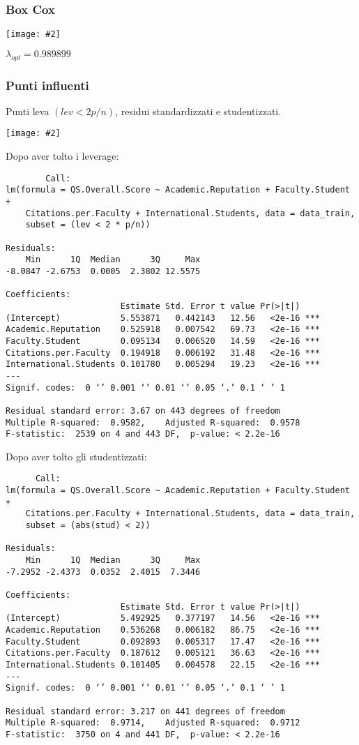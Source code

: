 \documentclass{beamer}
\newcommand{\fg}[2]{%
  \begin{center}
      \texttt{[image: \#2]}%
  \end{center}
}
\begin{document}
\begin{frame}[fragile]
\frametitle{Box Cox}
    \fg{0.6}{boxcoxfin.jpg}
    $\lambda_{opt} = 0.989899$
\end{frame}

\begin{frame}[fragile]
\frametitle{Punti influenti}
    Punti leva $(lev < 2  p/n)$, residui standardizzati e studentizzati.
    \fg{0.6}{plotreslev.jpg}
\end{frame}

\begin{frame}[fragile]
    Dopo aver tolto i leverage:
    {\tiny
    \begin{verbatim}
        Call:
lm(formula = QS.Overall.Score ~ Academic.Reputation + Faculty.Student + 
    Citations.per.Faculty + International.Students, data = data_train, 
    subset = (lev < 2 * p/n))

Residuals:
    Min      1Q  Median      3Q     Max 
-8.0847 -2.6753  0.0005  2.3802 12.5575 

Coefficients:
                       Estimate Std. Error t value Pr(>|t|)    
(Intercept)            5.553871   0.442143   12.56   <2e-16 ***
Academic.Reputation    0.525918   0.007542   69.73   <2e-16 ***
Faculty.Student        0.095134   0.006520   14.59   <2e-16 ***
Citations.per.Faculty  0.194918   0.006192   31.48   <2e-16 ***
International.Students 0.101780   0.005294   19.23   <2e-16 ***
---
Signif. codes:  0 ‘’ 0.001 ‘’ 0.01 ‘’ 0.05 ‘.’ 0.1 ‘ ’ 1

Residual standard error: 3.67 on 443 degrees of freedom
Multiple R-squared:  0.9582,	Adjusted R-squared:  0.9578 
F-statistic:  2539 on 4 and 443 DF,  p-value: < 2.2e-16
    \end{verbatim}
    }
\end{frame}

\begin{frame}[fragile]
    Dopo aver tolto gli studentizzati:
    {\tiny
    \begin{verbatim}
      Call:
lm(formula = QS.Overall.Score ~ Academic.Reputation + Faculty.Student + 
    Citations.per.Faculty + International.Students, data = data_train, 
    subset = (abs(stud) < 2))

Residuals:
    Min      1Q  Median      3Q     Max 
-7.2952 -2.4373  0.0352  2.4015  7.3446 

Coefficients:
                       Estimate Std. Error t value Pr(>|t|)    
(Intercept)            5.492925   0.377197   14.56   <2e-16 ***
Academic.Reputation    0.536268   0.006182   86.75   <2e-16 ***
Faculty.Student        0.092893   0.005317   17.47   <2e-16 ***
Citations.per.Faculty  0.187612   0.005121   36.63   <2e-16 ***
International.Students 0.101405   0.004578   22.15   <2e-16 ***
---
Signif. codes:  0 ‘’ 0.001 ‘’ 0.01 ‘’ 0.05 ‘.’ 0.1 ‘ ’ 1

Residual standard error: 3.217 on 441 degrees of freedom
Multiple R-squared:  0.9714,	Adjusted R-squared:  0.9712 
F-statistic:  3750 on 4 and 441 DF,  p-value: < 2.2e-16
    \end{verbatim}
    }
\end{frame}
\end{document}
